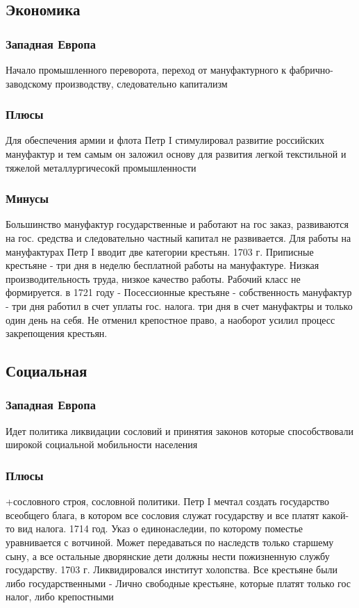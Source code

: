 \documentclass[a4paper]{article}
\begin{document}
\subsection{Экономика}
\subsubsection{Западная Европа}
Начало промышленного переворота, переход от мануфактурного к фабрично-заводскому производству, следовательно капитализм
\subsubsection{Плюсы}
Для обеспечения армии и флота Петр I стимулировал развитие российских мануфактур и тем самым он заложил основу для развития легкой текстильной и тяжелой металлургичесокй промышленности
\subsubsection{Минусы}
Большинство мануфактур государственные и работают на гос заказ, развиваются на гос. средства и следовательно частный капитал не развивается. Для работы на мануфактурах Петр I вводит две категории крестьян. 1703 г. Приписные крестьяне - три дня в неделю бесплатной работы на мануфактуре. Низкая производительность труда, низкое качество работы. Рабочий класс не формируется. в 1721 году - Посессионные крестьяне - собственность мануфактур - три дня работил в счет уплаты гос. налога. три дня в счет мануфактры и только один день на себя. Не отменил крепостное право, а наоборот усилил процесс закрепощения крестьян.

\subsection{Социальная}
\subsubsection{Западная Европа}
Идет политика ликвидации сословий и принятия законов которые способствовали широкой социальной мобильности населения
\subsubsection{Плюсы}
+сословного строя, сословной политики. Петр I мечтал создать государство всеобщего блага, в котором все сословия служат государству и все платят какой-то вид налога. 1714 год. Указ о единонаследии, по которому поместье уравнивается с вотчиной. Может передаваться по наследств только старшему сыну, а все остальные дворянские дети должны нести пожизненную службу государству. 1703 г. Ликвидировался институт холопства. Все крестьяне были либо государственными - Лично свободные крестьяне, которые платят только гос налог, либо крепостными
\end{document}

